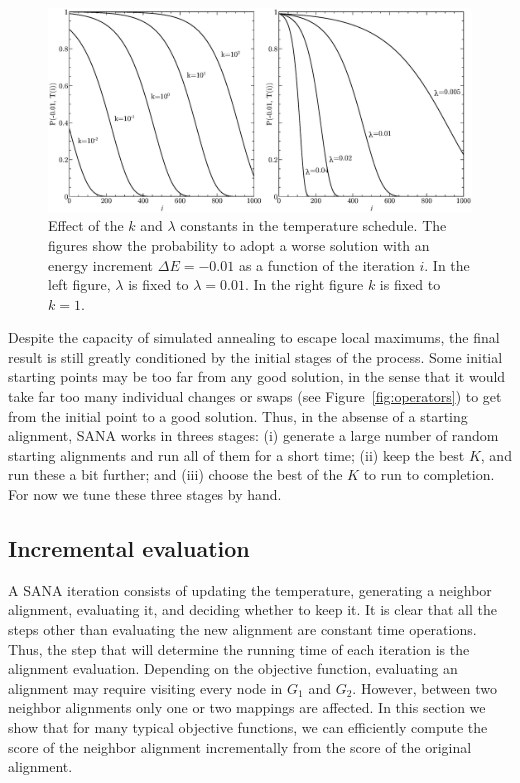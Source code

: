 \documentclass{bioinfo}
\begin{document}
\begin{methods}
\begin{figure}
\centering
\includegraphics[width=0.99\linewidth]{./SA_parameters.eps}
\caption{Effect of the $k$ and $\lambda$ constants in the temperature schedule. The figures show the probability to adopt a worse solution with an energy increment $\Delta E = -0.01$ as a function of the iteration $i$. In the left figure, $\lambda$ is fixed to $\lambda=0.01$. In the right figure $k$ is fixed to $k=1$.}
\label{fig:parameters}
\end{figure}

Despite the capacity of simulated annealing to escape local maximums, the final result is still greatly conditioned by the initial stages of the process. Some initial starting points may be too far from any good solution, in the sense that it would take far too many individual changes or swaps (see Figure~\ref{fig:operators}) to get from the initial point to a good solution.
Thus, in the absense of a starting alignment, SANA works in threes stages: (i) generate a large number of random starting alignments and run all of them for a short time; (ii) keep the best $K$, and run these a bit further; and (iii) choose the best of the $K$ to run to completion.  For now we tune these three stages by hand.

\subsection{Incremental evaluation}\label{implementation}

A SANA iteration consists of updating the temperature, generating a neighbor alignment, evaluating it, and deciding whether to keep it. It is clear that all the steps other than evaluating the new alignment are constant time operations. Thus, the step that will determine the running time of each iteration is the alignment evaluation. Depending on the objective function, evaluating an alignment may require visiting every node in $G_1$ and $G_2$. However, between two neighbor alignments only one or two mappings are affected. In this section we show that for many typical objective functions, we can efficiently compute the score of the neighbor alignment incrementally from the score of the original alignment.


\end{methods}
\end{document}
